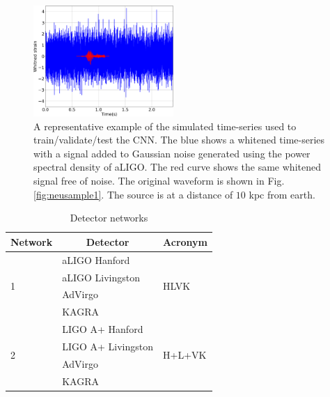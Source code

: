 \documentclass[aps,twocolumn,showpacs,groupedaddress, nofootinbib]{revtex4}  %
\begin{document}
%
%
\begin{figure}
\includegraphics[width=0.475\textwidth]{datasample.png}
\caption{A representative example of the simulated time-series used to
train/validate/test the \ac{CNN}. The blue shows a whitened time-series with a
signal added to Gaussian noise generated using the power spectral density of \ac{aLIGO}. 
The red curve shows the same whitened signal free of
noise. The original waveform is shown in Fig. \ref{fig:neusample1}.
The source is at a distance of $10$ kpc from earth.
\label{fig:sample}} 
\end{figure}

\begin{table}[]
\centering
\begin{threeparttable}
\caption{Detector networks}
\label{table:network}
\begin{tabular}{lll}
\toprule
Network            & \multicolumn{1}{c}{Detector}                & Acronym                 \\
\hline
\multirow{4}{*}{1} & \ac{aLIGO} Hanford~\cite{aasi2015advanced}    & \multirow{4}{*}{HLVK}   \\
                   & \ac{aLIGO} Livingston &                         \\
                   & \ac{AdVirgo}~\cite{acernese2014advanced}           &                         \\
                   & KAGRA~\cite{aso2013interferometer}                    &                         \\
                   \hline
\multirow{4}{*}{2} & LIGO A+ Hanford~\cite{miller2015prospects, LIGOW}          & \multirow{4}{*}{H+L+VK} \\
                   & LIGO A+ Livingston       &                         \\
                   & \ac{AdVirgo}           &                         \\
                   & KAGRA                    &                         \\
\hline
\hline
\end{tabular}
\begin{tablenotes}
\setlength{}
\end{tablenotes}
\end{threeparttable}
\end{table}
\end{document}
